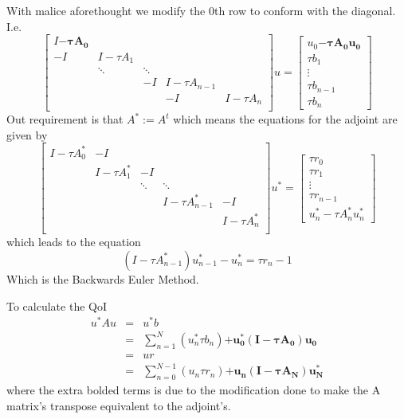 \documentclass[12pt]{article}
\begin{document}
With malice aforethought we modify the 0th row to conform with the diagonal. I.e.
\begin{equation}
\begin{bmatrix}
I\bm{-\tau A_0}\\
-I & I - \tau A_1\\
& \ddots & \ddots\\
& & -I & I - \tau A_{n-1}\\
& & & -I & I - \tau A_{n}\\
\end{bmatrix}
u = 
\begin{bmatrix}
u_0 \bm{- \tau A_0 u_0}\\
\tau b_1 \\
\vdots \\
\tau b_{n-1} \\
\tau b_n
\end{bmatrix}
\end{equation}
Out requirement is that $ A^* := A^t $ which means the equations for the adjoint are given by
\begin{equation}
\begin{bmatrix}
I-\tau A^*_0 & -I\\
& I - \tau A^*_1  & -I\\
& & \ddots & \ddots\\
& & & I - \tau A^*_{n-1} & -I\\
& & & & I - \tau A^*_{n}\\
\end{bmatrix}
u^* = 
\begin{bmatrix}
\tau r_0\\
\tau r_1 \\
\vdots \\
\tau r_{n-1} \\
u^*_n - \tau A^*_n u^*_n
\end{bmatrix}
\end{equation}
which leads to the equation
\begin{equation}\label{BEulerDiscrete}
(I-\tau A^*_{n-1})u^*_{n-1} - u^*_n = \tau r_n-1
\end{equation}
Which is the Backwards Euler Method.

To calculate the QoI
\begin{eqnarray}
u^* A u & = & u^* b \\
 & = & \sum_{n=1}^N \left(u^*_n \tau b_n\right) \bm{+ u^*_0(I-\tau A_0)u_0} \\
 & = & u r \\
 & = & \sum_{n=0}^{N-1}\left( u_n \tau r_n\right) \bm{+ u_n(I-\tau A_N)u^*_N}
\end{eqnarray}
where the extra bolded terms is due to the modification done to make the A matrix's transpose equivalent to the adjoint's.\\
\end{document}
